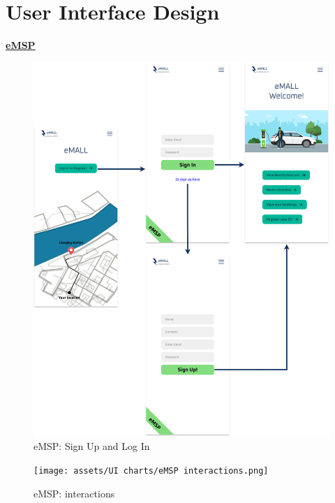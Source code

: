\documentclass[table, 12pt]{article}
\begin{document}
\section{User Interface Design}
\underline{\textbf{eMSP}}\\
\begin{center}
    \begin{figure}[H]
        \includegraphics[scale=0.3, center]{assets/UI charts/eMSP welcome.png}
        \caption{eMSP: Sign Up and Log In}
        \label{fig: eMSPsignMockup}
    \end{figure}
    \newpage
\end{center}

\begin{center}
    \begin{figure}[H]
        \vspace{-50px}
        \texttt{[image: assets/UI charts/eMSP interactions.png]}
        \caption{eMSP: interactions}
        \label{fig: eMSPinteractions}
    \end{figure}
    \newpage
\end{center}
\end{document}
